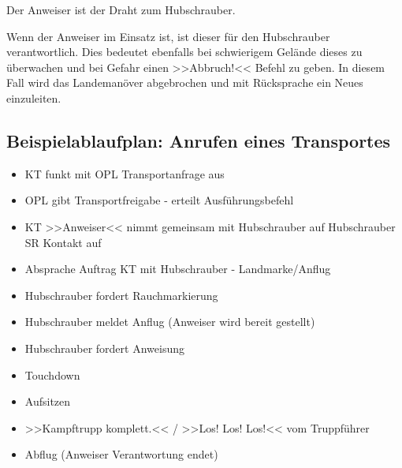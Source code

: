 	Der Anweiser ist der Draht zum Hubschrauber.

	Wenn der Anweiser im Einsatz ist, ist dieser für den Hubschrauber verantwortlich. Dies bedeutet ebenfalls bei schwierigem Gelände dieses zu überwachen und bei Gefahr einen >>Abbruch!<< Befehl zu geben. In diesem Fall wird das Landemanöver abgebrochen und mit Rücksprache ein Neues einzuleiten.

 

\subsection{Beispielablaufplan: Anrufen eines Transportes}

	\begin{itemize}

		\item KT funkt mit OPL Transportanfrage aus

    		\item OPL gibt Transportfreigabe - erteilt Ausführungsbefehl

    		\item KT >>Anweiser<< nimmt gemeinsam mit Hubschrauber auf Hubschrauber SR Kontakt auf

    		\item Absprache Auftrag KT mit Hubschrauber - Landmarke/Anflug

    		\item Hubschrauber fordert Rauchmarkierung

    		\item Hubschrauber meldet Anflug (Anweiser wird bereit gestellt)

    		\item Hubschrauber fordert Anweisung

    		\item Touchdown

    		\item Aufsitzen

    		\item >>Kampftrupp komplett.<< / >>Los! Los! Los!<< vom Truppführer

    		\item Abflug (Anweiser Verantwortung endet)

	\end{itemize}
